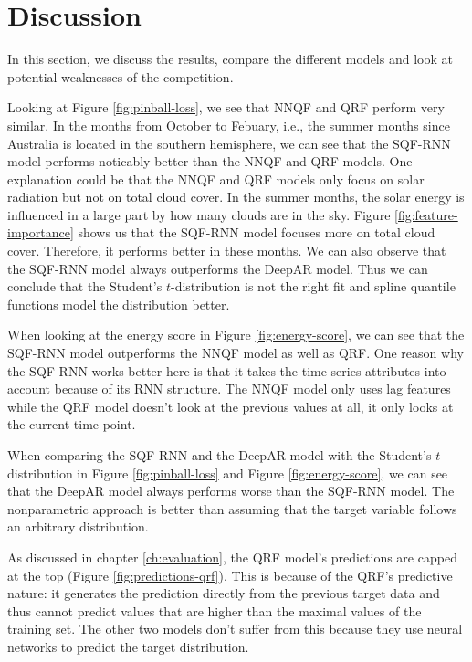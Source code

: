 \section{Discussion}
\label{sec:discussion}

In this section, we discuss the results, compare the different 
models and look at potential weaknesses of the competition. 

Looking at Figure \ref{fig:pinball-loss}, we see that NNQF and QRF perform very similar. 
In the months from October to Febuary, i.e., the summer months since 
Australia is located in the southern hemisphere, we can see that 
the SQF-RNN model performs noticably better than the NNQF and QRF models. 
One explanation could be that the NNQF and QRF models only focus on solar 
radiation but not on total cloud cover.  
In the summer months, the solar energy is influenced in a large part by 
how many clouds are in the sky. Figure \ref{fig:feature-importance} shows us that 
the SQF-RNN model focuses more on total cloud cover. Therefore, 
it performs better in these months. 
We can also observe that the SQF-RNN model always outperforms the DeepAR model. 
Thus we can conclude that the Student's \(t\)-distribution is not the right fit 
and spline quantile functions model the distribution better. 

When looking at the energy score in Figure \ref{fig:energy-score}, 
we can see that the SQF-RNN model outperforms the NNQF model as well as QRF.
One reason why the SQF-RNN works better here is that it takes 
the time series attributes into account because of its RNN structure. 
The NNQF model only uses lag features while the QRF model doesn't look 
at the previous values at all, it only looks at the current time point.

When comparing the SQF-RNN and the DeepAR model with 
the Student's \(t\)-distribution in Figure \ref{fig:pinball-loss} and 
Figure \ref{fig:energy-score}, we can see that the DeepAR model 
always performs worse than the SQF-RNN model. 
The nonparametric approach is better than assuming 
that the target variable follows an arbitrary distribution. 

As discussed in chapter \ref{ch:evaluation}, 
the QRF model's predictions are capped 
at the top (Figure \ref{fig:predictions-qrf}). 
This is because of the QRF's predictive nature: it generates 
the prediction directly from the previous target data 
and thus cannot predict values 
that are higher than the maximal values of the training set. 
The other two models don't suffer from this because they use 
neural networks to predict the target distribution.

